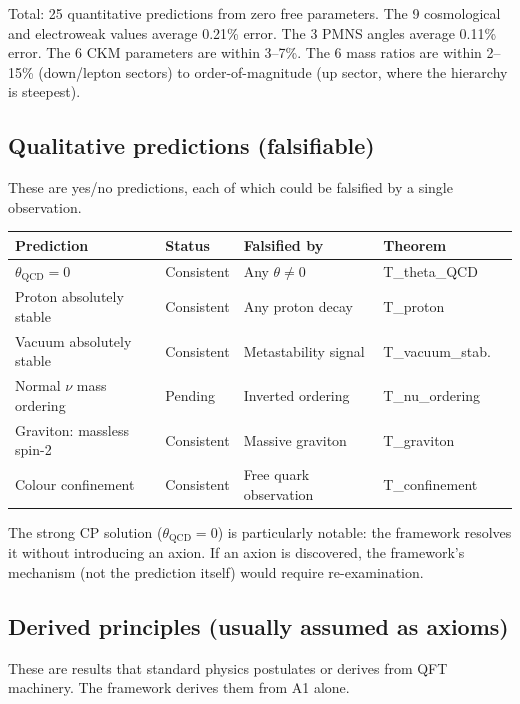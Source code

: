 \documentclass[11pt]{article}
\begin{document}
\smallskip

\noindent Total: 25 quantitative predictions from zero free parameters.  The 9 cosmological and electroweak values average 0.21\% error.  The 3 PMNS angles average 0.11\% error.  The 6 CKM parameters are within 3--7\%.  The 6 mass ratios are within 2--15\% (down/lepton sectors) to order-of-magnitude (up sector, where the hierarchy is steepest).


\subsection{Qualitative predictions (falsifiable)}

These are yes/no predictions, each of which could be falsified by a single observation.

\smallskip
\begin{center}
\small
\begin{tabular}{lllll}
\toprule
\textbf{Prediction} & \textbf{Status} & \textbf{Falsified by} & \textbf{Theorem} \\
\midrule
$\theta_{\mathrm{QCD}} = 0$ & Consistent & Any $\theta \ne 0$ & T\_theta\_QCD \\
Proton absolutely stable & Consistent & Any proton decay & T\_proton \\
Vacuum absolutely stable & Consistent & Metastability signal & T\_vacuum\_stab. \\
Normal $\nu$ mass ordering & Pending & Inverted ordering & T\_nu\_ordering \\
Graviton: massless spin-2 & Consistent & Massive graviton & T\_graviton \\
Colour confinement & Consistent & Free quark observation & T\_confinement \\
\bottomrule
\end{tabular}
\end{center}
\smallskip

The strong CP solution ($\theta_{\mathrm{QCD}} = 0$) is particularly notable: the framework resolves it without introducing an axion.  If an axion is discovered, the framework's mechanism (not the prediction itself) would require re-examination.


\subsection{Derived principles (usually assumed as axioms)}

These are results that standard physics postulates or derives from QFT machinery.  The framework derives them from A1 alone.
\end{document}
